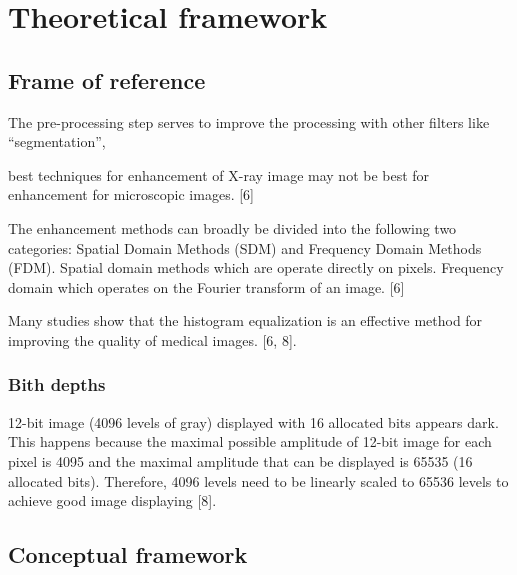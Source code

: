 \chapter{Theoretical framework}


\section{Frame of reference}
The pre-processing step serves to improve the processing with other filters
like “segmentation”, 

best techniques for enhancement of X-ray image may not be best for enhancement
for microscopic images. [6]

The enhancement methods can broadly be divided into the following two
categories: Spatial Domain Methods (SDM) and Frequency Domain Methods (FDM).
Spatial domain methods which are operate directly on pixels. Frequency domain
which operates on the Fourier transform of an image. [6]

Many studies show that the histogram equalization is an effective method for
improving the quality of medical images. [6, 8]. 

\subsection{Bith depths}

12-bit image (4096 levels of gray) displayed with 16 allocated bits appears
dark. This happens because the maximal possible amplitude of 12-bit image for
each pixel is 4095 and the maximal amplitude that can be displayed is 65535 (16
allocated bits). Therefore, 4096 levels need to be linearly scaled to 65536
levels to achieve good image displaying [8].


\section{Conceptual framework}

